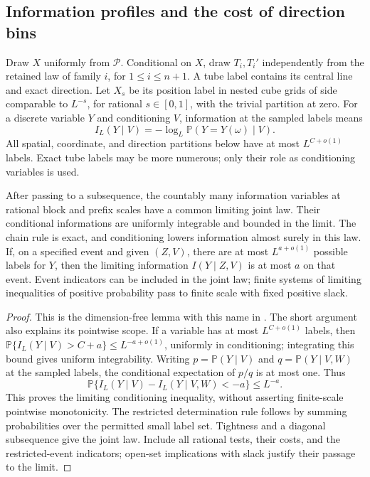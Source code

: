 \subsection{Information profiles and the cost of direction bins}

Draw $X$ uniformly from $\mathcal P$.  Conditional on $X$, draw
$T_i,T_i'$ independently from the retained law of family $i$, for
$1\le i\le n+1$.  A tube label contains its central line and exact
direction.  Let $X_s$ be its position label in nested cube grids of
side comparable to $L^{-s}$, for rational $s\in[0,1]$, with the
trivial partition at zero.  For a discrete variable $Y$ and conditioning
$V$, information at the sampled labels means
\[
 I_L(Y\mid V)=-\log_L\mathbb P(Y=Y(\omega)\mid V).
\]
All spatial, coordinate, and direction partitions below have at most
$L^{C+o(1)}$ labels.  Exact tube labels may be more numerous; only
their role as conditioning variables is used.

\begin{lemma}\label{t:information}
After passing to a subsequence, the countably many information variables
at rational block and prefix scales have a common limiting joint law.
Their conditional informations are uniformly integrable and bounded in
the limit.  The chain rule is exact, and conditioning lowers information
almost surely in this law.  If, on a specified event and given $(Z,V)$,
there are at most $L^{a+o(1)}$ possible labels for $Y$, then the limiting
information $I(Y\mid Z,V)$ is at most $a$ on that event.  Event
indicators can be included in the joint law; finite systems of limiting
inequalities of positive probability pass to finite scale with fixed
positive slack.
\end{lemma}

\begin{proof}
This is the dimension-free lemma with this name in
\citet[Section~3]{PSE2026}.  The short argument also explains its
pointwise scope.  If a variable has at most $L^{C+o(1)}$ labels, then
$\mathbb P\{I_L(Y\mid V)>C+a\}\le L^{-a+o(1)}$, uniformly in
conditioning; integrating this bound gives uniform integrability.
Writing $p=\mathbb P(Y\mid V)$ and $q=\mathbb P(Y\mid V,W)$ at
the sampled labels, the conditional expectation of $p/q$ is at most
one.  Thus
\[
 \mathbb P\{I_L(Y\mid V)-I_L(Y\mid V,W)<-a\}\le L^{-a}.
\]
This proves the limiting conditioning inequality, without asserting
finite-scale pointwise monotonicity.  The restricted determination rule
follows by summing probabilities over the permitted small label set.
Tightness and a diagonal subsequence give the joint law.  Include all
rational tests, their costs, and the restricted-event indicators;
open-set implications with slack justify their passage to the limit.
\end{proof}

